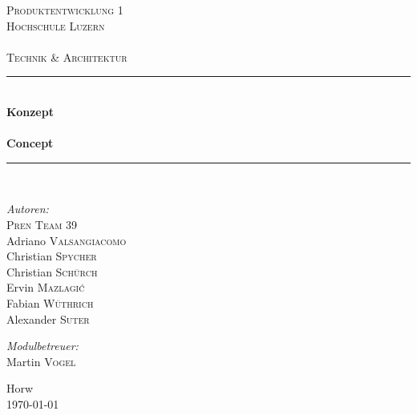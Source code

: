 \begin{titlepage}

\begin{center}

\textsc{\LARGE Produktentwicklung 1}\\[1.5cm]

\textsc{\Large Hochschule Luzern\\
    ~\\
    Technik \& Architektur}\\[0.5cm]

\vfill{}

\newcommand{\HRule}{\rule{\linewidth}{0.5mm}}
\HRule \\[0.4cm]
{   \Huge \bfseries Konzept\\
        ~\\
        \large Concept}\\[0.4cm]

\HRule \\[1.5cm]

\begin{minipage}{0.4\textwidth}
    \begin{flushleft} \large
        \emph{Autoren:}\\
        \textsc{Pren Team 39}\\
        Adriano \textsc{Valsangiacomo}\\
        Christian \textsc{Spycher}\\
        Christian \textsc{Schürch}\\
        Ervin \textsc{Mazlagi\'c}\\
        Fabian \textsc{Wüthrich}\\
        Alexander \textsc{Suter}\\
    \end{flushleft}
\end{minipage}
\hfill
\begin{minipage}{0.4\textwidth}
    \begin{flushright} \large
        \emph{Modulbetreuer:} \\
        Martin \textsc{Vogel}
    \end{flushright}
\end{minipage}

\vfill{}
\vfill{}
\vfill{}

{\large Horw\\ \today}

\end{center}

\end{titlepage}
